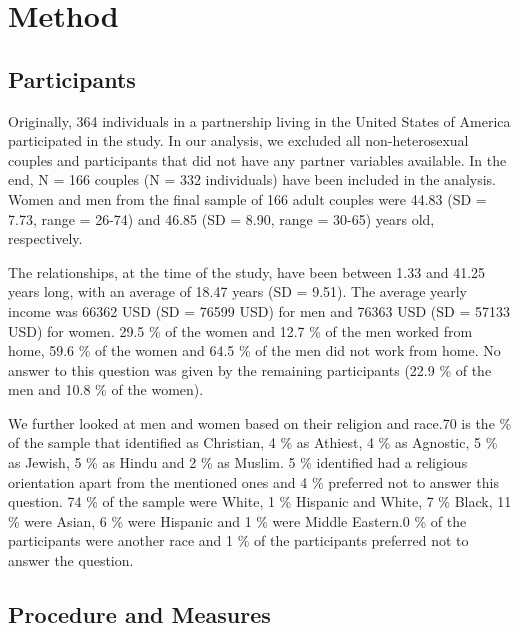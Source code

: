 \documentclass[
  man,floatsintext]{apa6}
\begin{document}
\hypertarget{method}{%
\section{Method}\label{method}}

\hypertarget{participants}{%
\subsection{Participants}\label{participants}}

Originally, 364 individuals in a partnership living in the United States of America participated in the study. In our analysis, we excluded all non-heterosexual couples and participants that did not have any partner variables available. In the end, N = 166 couples (N = 332 individuals) have been included in the analysis. Women and men from the final sample of 166 adult couples were 44.83 (SD = 7.73, range = 26-74) and 46.85 (SD = 8.90, range = 30-65) years old, respectively.

The relationships, at the time of the study, have been between 1.33 and 41.25 years long, with an average of 18.47 years (SD = 9.51). The average yearly income was 66362 USD (SD = 76599 USD) for men and 76363 USD (SD = 57133 USD) for women. 29.5 \% of the women and 12.7 \% of the men worked from home, 59.6 \% of the women and 64.5 \% of the men did not work from home. No answer to this question was given by the remaining participants (22.9 \% of the men and 10.8 \% of the women).

We further looked at men and women based on their religion and race.70 is the \% of the sample that identified as Christian, 4 \% as Athiest, 4 \% as Agnostic, 5 \% as Jewish, 5 \% as Hindu and 2 \% as Muslim. 5 \% identified had a religious orientation apart from the mentioned ones and 4 \% preferred not to answer this question.
74 \% of the sample were White, 1 \% Hispanic and White, 7 \% Black, 11 \% were Asian, 6 \% were Hispanic and 1 \% were Middle Eastern.0 \% of the participants were another race and 1 \% of the participants preferred not to answer the question.

\hypertarget{procedure-and-measures}{%
\subsection{Procedure and Measures}\label{procedure-and-measures}}
\end{document}
